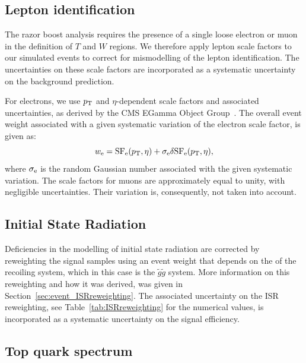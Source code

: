 \subsection{Lepton identification} 

The razor boost analysis requires the presence of a single loose electron or muon in the definition
of $T$ and $W$ regions. We therefore apply lepton scale factors to our simulated events to correct
for mismodelling of the lepton identification. The uncertainties on these scale factors are
incorporated as a systematic uncertainty on the background prediction.  

For electrons, we use $p_{\mathrm{T}}$ and $\eta$-dependent scale factors and associated uncertainties, as
derived by the CMS EGamma Object Group~\cite{ElectronSF}.
The overall event weight associated with a given systematic variation of the electron scale
factor, is given as:
\begin{equation}
w_{\rm e} = {\rm SF_{e}}(p_{\mathrm{T}}, \eta) + \sigma_{\rm e} \delta {\rm SF_{e}}(p_{\mathrm{T}}, \eta), 
\end{equation}
where $\sigma_{\rm e}$ is the random Gaussian number associated with the given systematic variation.
The scale factors for muons are approximately equal to unity, with negligible uncertainties. Their
variation is, consequently, not taken into account.

\subsection{Initial State Radiation} 

Deficiencies in the modelling of initial state radiation are corrected by reweighting the
signal samples using an event weight that depends on the \pt of the recoiling system, which in this
case is the $\tilde{g}\tilde{g}$ system. 
More information on this reweighting and how it was derived, was given in
Section~\ref{sec:event_ISRreweighting}. 
The associated uncertainty on the ISR reweighting, see Table~\ref{tab:ISRreweighting} for the
numerical values, is incorporated as a systematic uncertainty on the signal efficiency. 

\subsection{Top quark \texorpdfstring{\pt}{pT} spectrum} 

